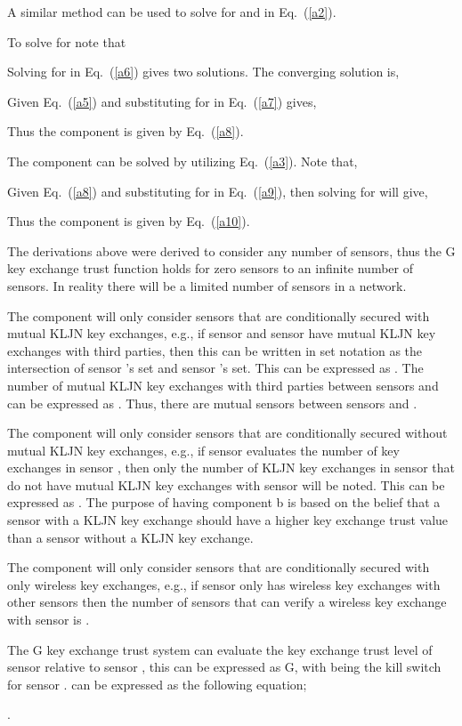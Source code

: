 \documentclass{ws-fnl2}
\begin{document}
\noindent
A similar method can be used to solve for  and  in Eq.~(\ref{a2}). 

To solve for  note that 




\noindent
Solving for  in Eq.~(\ref{a6}) gives two solutions. The converging solution is,



\noindent
Given Eq.~(\ref{a5}) and substituting for  in Eq.~(\ref{a7}) gives,



\noindent
Thus the component  is given by Eq.~(\ref{a8}).


The component  can be solved by utilizing Eq.~(\ref{a3}). Note that,





\noindent
Given Eq.~(\ref{a8}) and substituting for  in Eq.~(\ref{a9}), then solving for  will give,



\noindent
Thus the component  is given by Eq.~(\ref{a10}).

The derivations above were derived to consider any number of sensors, thus the G key exchange trust function holds for zero sensors to an infinite number of sensors. In reality there will be a limited number of sensors in a network. 

The component  will only consider sensors that are conditionally secured with mutual KLJN key exchanges, e.g., if sensor  and sensor  have mutual KLJN key exchanges with third parties, then this can be written in set notation as the intersection of sensor 's  set and sensor 's  set. This can be expressed as . The number of mutual KLJN key exchanges with third parties between sensors  and  can be expressed as . Thus, there are  mutual sensors between sensors  and . 

The component  will only consider sensors that are conditionally secured without mutual KLJN key exchanges, e.g., if sensor  evaluates the number of key exchanges in sensor , then only the number of KLJN key exchanges in sensor  that do not have mutual KLJN key exchanges with sensor  will be noted. This can be expressed as . The purpose of having component b is based on the belief that a sensor with a KLJN key exchange should have a higher key exchange trust value than a sensor without a KLJN key exchange.

The component  will only consider sensors that are conditionally secured with only wireless key exchanges, e.g., if sensor  only has wireless key exchanges with other sensors then the number of sensors that can verify a wireless key exchange with sensor  is . 

The G key exchange trust system can evaluate the key exchange trust level of sensor  relative to sensor , this can be expressed as G, with  being the kill switch for sensor .  can be expressed as the following equation;



\noindent
. 
\end{document}
